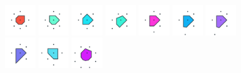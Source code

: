 \documentclass[text.tex]{subfiles}
\begin{document}
\begin{figure}[h!]
\includegraphics[width=0.12\textwidth]{img/results/circle8/circle8_120710_(0_1alpha_2)_005.pdf}
\includegraphics[width=0.12\textwidth]{img/results/circle8/circle8_120710_(0_1alpha_2)_006.pdf}
\includegraphics[width=0.12\textwidth]{img/results/circle8/circle8_120710_(0_1alpha_2)_007.pdf}
\includegraphics[width=0.12\textwidth]{img/results/circle8/circle8_120710_(0_1alpha_2)_008.pdf}
\includegraphics[width=0.12\textwidth]{img/results/circle8/circle8_120710_(0_1alpha_2)_009.pdf}
\includegraphics[width=0.12\textwidth]{img/results/circle8/circle8_120710_(0_1alpha_2)_010.pdf}
\includegraphics[width=0.12\textwidth]{img/results/circle8/circle8_120710_(0_1alpha_2)_011.pdf}
\includegraphics[width=0.12\textwidth]{img/results/circle8/circle8_120710_(0_1alpha_2)_012.pdf}
\includegraphics[width=0.12\textwidth]{img/results/circle8/circle8_120710_(0_1alpha_2)_013.pdf}
\includegraphics[width=0.12\textwidth]{img/results/circle8/circle8_120710_(0_1alpha_2)_014.pdf}
\end{figure}
\end{document}
